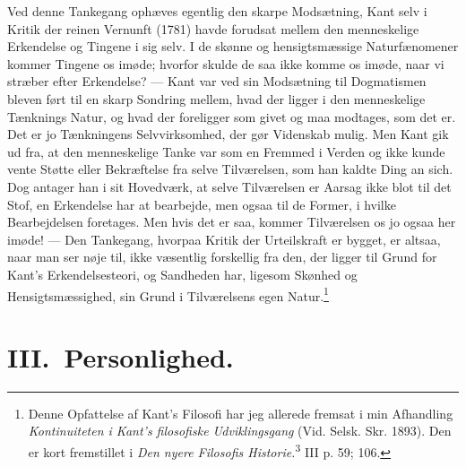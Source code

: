 \documentclass[12pt]{article}
\begin{document}
Ved denne Tankegang ophæves egentlig den skarpe Modsætning, Kant selv
i \guillemotright{}Kritik der reinen Vernunft\guillemotleft{} (1781) havde forudsat mellem den
menneskelige Erkendelse og \guillemotright{}Tingene i sig selv\guillemotleft{}. I de skønne og
hensigtsmæssige Naturfænomener kommer \guillemotright{}Tingene\guillemotleft{} os imøde; hvorfor
skulde de saa ikke komme os imøde, naar vi stræber efter Erkendelse?
--- Kant var ved sin Modsætning til Dogmatismen bleven ført til en
skarp Sondring mellem, hvad der ligger i den menneskelige Tænknings
Natur, og hvad der foreligger som givet og maa modtages, som det er.
Det er jo Tænkningens Selvvirksomhed, der gør Videnskab mulig. Men Kant
gik ud fra, at den menneskelige Tanke var som en Fremmed i Verden og
ikke kunde vente Støtte eller Bekræftelse fra selve Tilværelsen, som
han kaldte \guillemotright{}Ding an sich\guillemotleft{}. Dog antager han i sit Hovedværk,
at selve Tilværelsen er Aarsag ikke blot til det
\guillemotright{}Stof\guillemotleft{}, en Erkendelse har at bearbejde, men ogsaa til de
\guillemotright{}Former\guillemotleft{}, i hvilke Bearbejdelsen foretages. Men hvis det er saa,
kommer Tilværelsen os jo ogsaa her imøde! --- Den Tankegang, hvorpaa
\guillemotright{}Kritik der Urteilskraft\guillemotleft{} er bygget, er altsaa, naar man ser
nøje til, ikke væsentlig forskellig fra den, der ligger til Grund for
Kant's Erkendelsesteori, og Sandheden har, ligesom Skønhed og
Hensigtsmæssighed, sin Grund i Tilværelsens egen
Natur.\footnote{Denne Opfattelse af Kant's Filosofi har jeg allerede
fremsat i min Afhandling \textit{Kontinuiteten i Kant's filosofiske
Udviklingsgang} (Vid. Selsk. Skr. 1893). Den er kort fremstillet i
\textit{Den nyere Filosofis Historie.}\textsuperscript{3} III p. 59;
106.}

\section*{III.\ Personlighed.}
\end{document}
